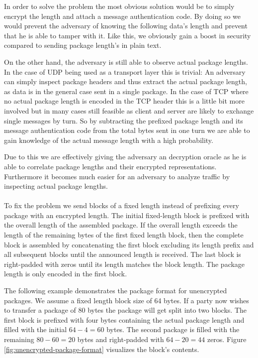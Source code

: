In order to solve the problem the most obvious solution would be to simply encrypt the length and attach a message authentication code.
By doing so we would prevent the adversary of knowing the following data's length and prevent that he is able to tamper with it.
Like this, we obviously gain a boost in security compared to sending package length's in plain text.

On the other hand, the adversary is still able to observe actual package lengths.
In the case of UDP being used as a transport layer this is trivial:
An adversary can simply inspect package headers and thus extract the actual package length, as data is in the general case sent in a single package.
In the case of TCP where no actual package length is encoded in the TCP header this is a little bit more involved but in many cases still feasible as client and server are likely to exchange single messages by turn.
So by subtracting the prefixed package length and its message authentication code from the total bytes sent in one turn we are able to gain knowledge of the actual message length with a high probability.

Due to this we are effectively giving the adversary an decryption oracle as he is able to correlate package lengths and their encrypted representations.
Furthermore it becomes much easier for an adversary to analyze traffic by inspecting actual package lengths.
\\\\

To fix the problem we send blocks of a fixed length instead of prefixing every package with an encrypted length.
The initial fixed-length block is prefixed with the overall length of the assembled package.
If the overall length exceeds the length of the remaining bytes of the first fixed length block, then the complete block is assembled by concatenating the first block excluding its length prefix and all subsequent blocks until the announced length is received.
The last block is right-padded with zeros until its length matches the block length.
The package length is only encoded in the first block.

The following example demonstrates the package format for unencrypted packages.
We assume a fixed length block size of 64 bytes.
If a party now wishes to transfer a package of 80 bytes the package will get split into two blocks.
The first block is prefixed with four bytes containing the actual package length and filled with the initial $64 - 4 = 60$ bytes.
The second package is filled with the remaining $80 - 60 = 20$ bytes and right-padded with $64 - 20 = 44$ zeros.
Figure \ref{fig:unencrypted-package-format} visualizes the block's contents.

